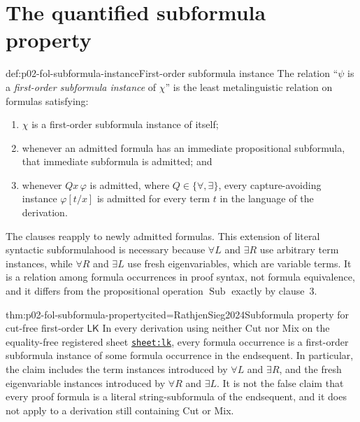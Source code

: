 \section{The quantified subformula property}
\label{sec:p02-fol-subformula-property}

\begin{hbdefinition}{def:p02-fol-subformula-instance}{First-order subformula instance}
The relation ``\(\psi\) is a \emph{first-order subformula instance} of
\(\chi\)'' is the least metalinguistic relation on formulas satisfying:
\begin{enumerate}
  \item \(\chi\) is a first-order subformula instance of itself;
  \item whenever an admitted formula has an immediate propositional
        subformula, that immediate subformula is admitted; and
  \item whenever \(Qx\,\varphi\) is admitted, where
        \(Q\in\{\forall,\exists\}\), every capture-avoiding instance
        \(\varphi[t/x]\) is admitted for every term \(t\) in the language of
        the derivation.
\end{enumerate}
The clauses reapply to newly admitted formulas.  This extension of literal
syntactic subformulahood is necessary because \(\forall L\) and \(\exists R\)
use arbitrary term instances, while \(\forall R\) and \(\exists L\) use fresh
eigenvariables, which are variable terms.  It is a relation among formula
occurrences in proof syntax, not formula equivalence, and it differs from the
propositional operation \(\operatorname{Sub}\) exactly by clause~3.
\end{hbdefinition}

\begin{hbtheorem}{thm:p02-fol-subformula-property}{cited=RathjenSieg2024}{Subformula property for cut-free first-order \(\mathsf{LK}\)}
In every derivation using neither Cut nor Mix on the equality-free registered
sheet \hyperref[sheet:lk]{\texttt{sheet:lk}}, every formula occurrence is a
first-order subformula instance of some formula occurrence in the endsequent.
In particular, the claim includes the term instances introduced by
\(\forall L\) and \(\exists R\), and the fresh eigenvariable instances
introduced by \(\forall R\) and \(\exists L\).  It is not the false claim that
every proof formula is a literal string-subformula of the endsequent, and it
does not apply to a derivation still containing Cut or Mix.
\end{hbtheorem}

